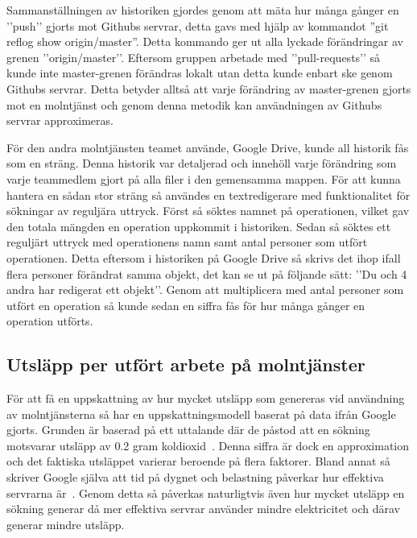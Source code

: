 Sammanställningen av historiken gjordes genom att mäta hur många gånger en ’’push’’ gjorts mot Githubs servrar, detta gavs med hjälp av kommandot ”git reflog show origin/master”. Detta kommando ger ut alla lyckade förändringar av grenen ’’origin/master’’. Eftersom gruppen arbetade med ’’pull-requests’’ så kunde inte master-grenen förändras lokalt utan detta kunde enbart ske genom Githubs servrar. Detta betyder alltså att varje förändring av master-grenen gjorts mot en molntjänst och genom denna metodik kan användningen av Githubs servrar approximeras. 

För den andra molntjänsten teamet använde, Google Drive, kunde all historik fås som en sträng. Denna historik var detaljerad och innehöll varje förändring som varje teammedlem gjort på alla filer i den gemensamma mappen. För att kunna hantera en sådan stor sträng så användes en textredigerare med funktionalitet för sökningar av reguljära uttryck. Först så söktes namnet på operationen, vilket gav den totala mängden en operation uppkommit i historiken. Sedan så söktes ett reguljärt uttryck med operationens namn samt antal personer som utfört operationen. Detta eftersom i historiken på Google Drive så skrivs det ihop ifall flera personer förändrat samma objekt, det kan se ut på följande sätt: ’’Du och 4 andra har redigerat ett objekt’’. Genom att multiplicera med antal personer som utfört en operation så kunde sedan en siffra fås för hur många gånger en operation utförts.

\subsection{Utsläpp per utfört arbete på molntjänster}
\label{joel_a-method-cloud-eq}
För att få en uppskattning av hur mycket utsläpp som genereras vid användning av molntjänsterna så har en uppskattningsmodell baserat på data ifrån Google gjorts. Grunden är baserad på ett  uttalande där de påstod att en sökning motsvarar utsläpp av 0.2 gram koldioxid~\cite{google-blog}. Denna siffra är dock en approximation och det faktiska utsläppet varierar beroende på flera faktorer. Bland annat så skriver Google själva att tid på dygnet och belastning påverkar hur effektiva servrarna är~\cite{google-warehouse}. Genom detta så påverkas naturligtvis även hur mycket utsläpp en sökning generar då mer effektiva servrar använder mindre elektricitet och därav generar mindre utsläpp. 

